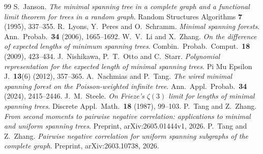 \documentclass[10pt,a4paper]{amsart}
\begin{document}
\begin{thebibliography}{99}
 S.~Janson. \emph{The minimal spanning tree in a complete graph and a functional limit theorem for trees in a random graph}. Random Structures Algorithms \textbf{7} (1995), 337--355.
 R.~Lyons, Y.~Peres and O.~Schramm. \emph{Minimal spanning forests}. Ann.\ Probab.\ \textbf{34} (2006), 1665--1692.
 W.~V.~Li and X.~Zhang. \emph{On the difference of expected lengths of minimum spanning trees}. Combin.\ Probab.\ Comput.\ \textbf{18} (2009), 423--434.
 J.~Nishikawa, P.~T.~Otto and C.~Starr. \emph{Polynomial representation for the expected length of minimal spanning trees}. Pi Mu Epsilon J.\ \textbf{13}(6) (2012), 357--365.
 A.~Nachmias and P.~Tang. \emph{The wired minimal spanning forest on the Poisson-weighted infinite tree}. Ann.\ Appl.\ Probab.\ \textbf{34} (2024), 2415--2446.
 J.~M.~Steele. \emph{On Frieze's $\zeta(3)$ limit for lengths of minimal spanning trees}. Discrete Appl.\ Math.\ \textbf{18} (1987), 99--103.
 P.~Tang and Z.~Zhang. \emph{From second moments to pairwise negative correlation: applications to minimal and uniform spanning trees}. Preprint, arXiv:2605.01444v1, 2026.
 P.~Tang and Z.~Zhang. \emph{Pairwise negative correlation for uniform spanning subgraphs of the complete graph}. Preprint, arXiv:2603.10738, 2026.
\end{thebibliography}
\end{document}
